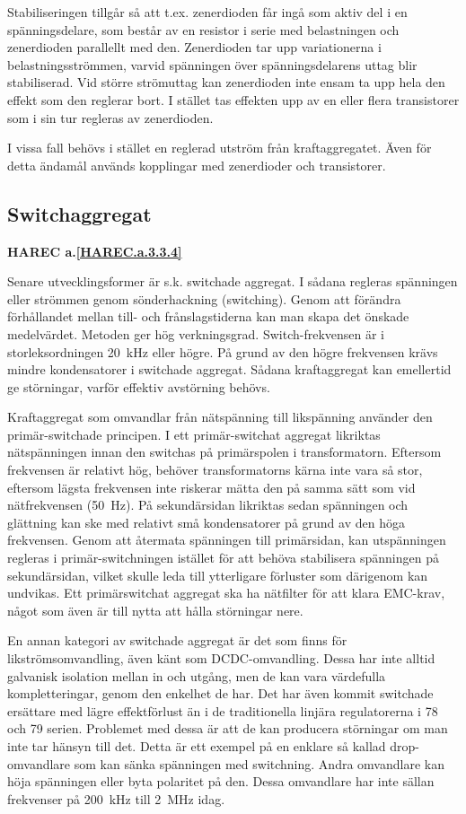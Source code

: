 Stabiliseringen tillgår så att t.ex. zenerdioden får ingå som aktiv del i en
spänningsdelare, som består av en resistor i serie med belastningen och
zenerdioden parallellt med den.
Zenerdioden tar upp variationerna i belastningsströmmen, varvid spänningen över
spänningsdelarens uttag blir stabiliserad.
Vid större strömuttag kan zenerdioden inte ensam ta upp hela den effekt som den
reglerar bort.
I stället tas effekten upp av en eller flera transistorer som i sin tur
regleras av zenerdioden.

I vissa fall behövs i stället en reglerad utström från kraftaggregatet.
Även för detta ändamål används kopplingar med zenerdioder och transistorer.

\subsection{Switchaggregat}
\textbf{HAREC a.\ref{HAREC.a.3.3.4}\label{myHAREC.a.3.3.4}}

Senare utvecklingsformer är s.k. switchade aggregat.
I sådana regleras spänningen eller strömmen genom sönderhackning (switching).
Genom att förändra förhållandet mellan till- och frånslagstiderna kan man skapa
det önskade medelvärdet.
Metoden ger hög verkningsgrad.
Switch-frekvensen är i storleksordningen 20~kHz eller högre.
På grund av den högre frekvensen krävs mindre kondensatorer i switchade
aggregat.
Sådana kraftaggregat kan emellertid ge störningar, varför effektiv avstörning
behövs.

Kraftaggregat som omvandlar från nätspänning till likspänning använder
den primär-switchade principen.
I ett primär-switchat aggregat likriktas nätspänningen innan den switchas på
primärspolen i transformatorn.
Eftersom frekvensen är relativt hög, behöver transformatorns kärna inte
vara så stor, eftersom lägsta frekvensen inte riskerar mätta den på samma
sätt som vid nätfrekvensen (50~Hz).
På sekundärsidan likriktas sedan spänningen och glättning kan ske med relativt
små kondensatorer på grund av den höga frekvensen.
Genom att återmata spänningen till primärsidan, kan utspänningen regleras i
primär-switchningen istället för att behöva stabilisera spänningen på
sekundärsidan, vilket skulle leda till ytterligare förluster som därigenom kan
undvikas.
Ett primärswitchat aggregat ska ha nätfilter för att klara EMC-krav, något som
även är till nytta att hålla störningar nere.

En annan kategori av switchade aggregat är det som finns för
likströmsomvandling, även känt som DCDC-omvandling.
Dessa har inte alltid galvanisk isolation mellan in och utgång, men de kan vara
värdefulla kompletteringar, genom den enkelhet de har.
Det har även kommit switchade ersättare med lägre effektförlust än i de
traditionella linjära regulatorerna i 78 och 79 serien.
Problemet med dessa är att de kan producera störningar om man inte tar hänsyn
till det.
Detta är ett exempel på en enklare så kallad drop-omvandlare som kan sänka
spänningen med switchning.
Andra omvandlare kan höja spänningen eller byta polaritet på den.
Dessa omvandlare har inte sällan frekvenser på 200~kHz till 2~MHz idag.

